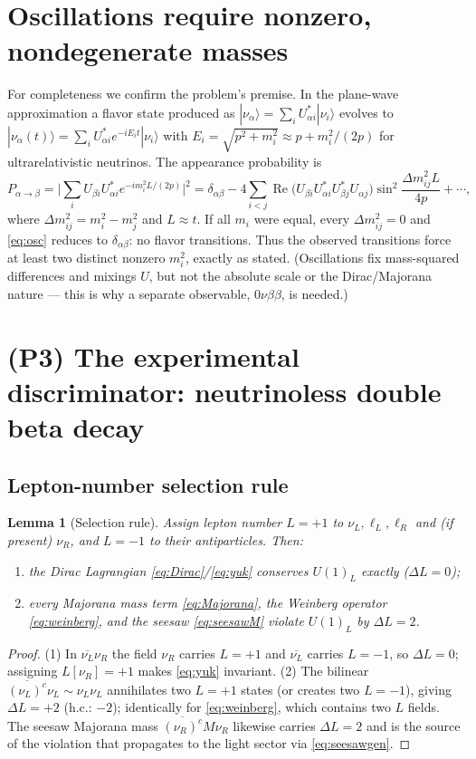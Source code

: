 \documentclass[12pt]{article}
\newtheorem{lemma}{Lemma}
\theoremstyle{definition}
\newcommand{\nuL}{\nu_L}
\newcommand{\nuR}{\nu_R}
\begin{document}
\section{Oscillations require nonzero, nondegenerate masses}

For completeness we confirm the problem's premise. In the plane-wave
approximation a flavor state produced as
$|\nu_\alpha\rangle=\sum_i U^*_{\alpha i}|\nu_i\rangle$ evolves to
$|\nu_\alpha(t)\rangle=\sum_i U^*_{\alpha i}e^{-iE_it}|\nu_i\rangle$ with
$E_i=\sqrt{p^2+m_i^2}\approx p+m_i^2/(2p)$ for ultrarelativistic
neutrinos. The appearance probability is
\begin{equation}\label{eq:osc}
P_{\alpha\to\beta}=\Big|\sum_i U_{\beta i}U^*_{\alpha i}
e^{-i m_i^2 L/(2p)}\Big|^2
=\delta_{\alpha\beta}
-4\!\!\sum_{i<j}\!\operatorname{Re}\!\big(U_{\beta i}U^*_{\alpha i}
U^*_{\beta j}U_{\alpha j}\big)\sin^2\!\frac{\Delta m^2_{ij}L}{4p}+\cdots,
\end{equation}
where $\Delta m^2_{ij}=m_i^2-m_j^2$ and $L\approx t$. If all
$m_i$ were equal, every $\Delta m^2_{ij}=0$ and
\eqref{eq:osc} reduces to $\delta_{\alpha\beta}$: no flavor transitions.
Thus the observed transitions force at least two distinct nonzero
$m_i^2$, exactly as stated. (Oscillations fix mass-squared differences and
mixings $U$, but not the absolute scale or the Dirac/Majorana nature ---
this is why a separate observable, $0\nu\beta\beta$, is needed.)

\section{(P3) The experimental discriminator: neutrinoless double beta decay}

\subsection{Lepton-number selection rule}
\begin{lemma}[Selection rule]\label{lem:LN}
Assign lepton number $L=+1$ to $\nuL,\ell_L,\ell_R$ and (if present)
$\nuR$, and $L=-1$ to their antiparticles. Then:
\begin{enumerate}
\item the Dirac Lagrangian \eqref{eq:Dirac}/\eqref{eq:yuk} conserves
$U(1)_L$ exactly ($\Delta L=0$);
\item every Majorana mass term
\eqref{eq:Majorana}, the Weinberg operator \eqref{eq:weinberg}, and the
seesaw \eqref{eq:seesawM} violate $U(1)_L$ by $\Delta L=2$.
\end{enumerate}
\end{lemma}
\begin{proof}
(1) In $\overline{\nuL}\nuR$ the field $\nuR$ carries $L=+1$ and
$\overline{\nuL}$ carries $L=-1$, so $\Delta L=0$; assigning
$L[\nuR]=+1$ makes \eqref{eq:yuk} invariant.
(2) The bilinear $\overline{(\nuL)^c}\nuL\sim \nuL\nuL$ annihilates two
$L=+1$ states (or creates two $L=-1$), giving $\Delta L=+2$ (h.c.:
$-2$); identically for \eqref{eq:weinberg}, which contains two $L$ fields.
The seesaw Majorana mass $\overline{(\nuR)^c}M\nuR$ likewise carries
$\Delta L=2$ and is the source of the violation that propagates to the
light sector via \eqref{eq:seesawgen}.
\end{proof}
\end{document}
